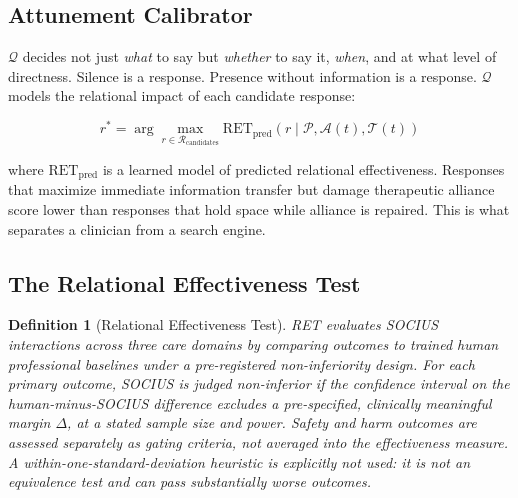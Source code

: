 \documentclass[12pt]{article}
\newtheorem{definition}{Definition}
\begin{document}
\subsection{Attunement Calibrator}

$\mathcal{Q}$ decides not just \textit{what} to say but \textit{whether} to say it, \textit{when}, and at what level of directness. Silence is a response. Presence without information is a response. $\mathcal{Q}$ models the relational impact of each candidate response:

\begin{equation}
r^* = \arg\max_{r \in \mathcal{R}_{\text{candidates}}} \text{RET}_{\text{pred}}(r \mid \mathcal{P}, \mathcal{A}(t), \mathcal{T}(t))
\end{equation}

where $\text{RET}_{\text{pred}}$ is a learned model of predicted relational effectiveness. Responses that maximize immediate information transfer but damage therapeutic alliance score lower than responses that hold space while alliance is repaired. This is what separates a clinician from a search engine.

\subsection{The Relational Effectiveness Test}

\begin{definition}[Relational Effectiveness Test]
RET evaluates SOCIUS interactions across three care domains by comparing outcomes to trained human professional baselines under a pre-registered \emph{non-inferiority} design. For each primary outcome, SOCIUS is judged non-inferior if the confidence interval on the human-minus-SOCIUS difference excludes a pre-specified, clinically meaningful margin $\Delta$, at a stated sample size and power. Safety and harm outcomes are assessed \emph{separately} as gating criteria, not averaged into the effectiveness measure. A within-one-standard-deviation heuristic is explicitly \emph{not} used: it is not an equivalence test and can pass substantially worse outcomes.
\end{definition}
\end{document}
